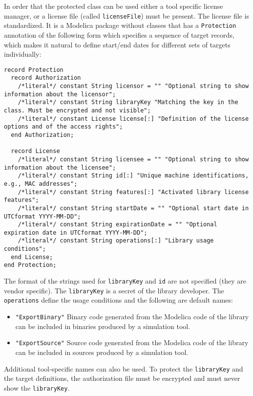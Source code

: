 In order that the protected class can be used either a tool specific license manager, or a license file (called \lstinline!licenseFile!) must be present.
The license file is standardized.
It is a Modelica package without classes that has a \lstinline!Protection! annotation of the following form which specifies a sequence of target records, which makes it natural to define start/end dates for different sets of targets individually:
\begin{lstlisting}[language=modelica]
record Protection
  record Authorization
    /*literal*/ constant String licensor = "" "Optional string to show information about the licensor";
    /*literal*/ constant String libraryKey "Matching the key in the class. Must be encrypted and not visible";
    /*literal*/ constant License license[:] "Definition of the license options and of the access rights";
  end Authorization;

  record License
    /*literal*/ constant String licensee = "" "Optional string to show information about the licensee";
    /*literal*/ constant String id[:] "Unique machine identifications, e.g., MAC addresses";
    /*literal*/ constant String features[:] "Activated library license features";
    /*literal*/ constant String startDate = "" "Optional start date in UTCformat YYYY-MM-DD";
    /*literal*/ constant String expirationDate = "" "Optional expiration date in UTCformat YYYY-MM-DD";
    /*literal*/ constant String operations[:] "Library usage conditions";
  end License;
end Protection;
\end{lstlisting}%

The format of the strings used for \lstinline!libraryKey! and \lstinline!id! are not specified (they are vendor specific).
The \lstinline!libraryKey! is a secret of the library developer.
The \lstinline!operations! define the usage conditions and the following are default names:
\begin{itemize}
\item
  \lstinline!"ExportBinary"! Binary code generated from the Modelica code of the library can be included in binaries produced by a simulation tool.
\item
  \lstinline!"ExportSource"! Source code generated from the Modelica code of the library can be included in sources produced by a simulation tool.
\end{itemize}

Additional tool-specific names can also be used.
To protect the \lstinline!libraryKey! and the target definitions, the authorization file must be encrypted and must never show the \lstinline!libraryKey!.

